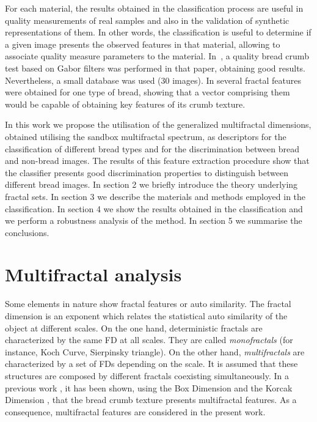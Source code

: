 \documentclass[oneside,a4paper,english,links]{article}
\begin{document}
For each material, the results obtained in the classification process are useful in quality measurements of real samples and also in the validation of synthetic representations of them. In other words, the classification is useful to determine if a given image presents the observed features in that material, allowing to associate quality measure parameters to the material. In~\cite{Fan2006}, a quality bread crumb test based on Gabor filters was performed in that paper, obtaining good results. Nevertheless, a small database was used ($30$ images). In \cite{Gonzales2008} several fractal features were obtained for one type of bread, showing that a vector comprising them would be capable of obtaining key features of its crumb texture.

In this work we propose the utilisation of the generalized multifractal dimensions, obtained utilising the sandbox multifractal spectrum, as descriptors for the classification of different bread types and for the discrimination between bread and non-bread images. The results of this feature extraction procedure show that the classifier presents good discrimination properties to distinguish between different bread images. In section 2 we briefly introduce the theory underlying fractal sets. In section 3 we describe the materials and methods employed in the classification. In section 4 we show the results obtained in the classification and we perform a robustness analysis of the method. In section 5 we summarise the conclusions.

\section{Multifractal analysis}
Some elements in nature show fractal features or auto similarity. The fractal dimension is an exponent which relates the statistical auto similarity of the object at different scales. On the one hand, deterministic fractals are characterized by the same FD at all scales. They are called {\em monofractals} (for instance, Koch Curve, Sierpinsky triangle). On the other hand, {\em multifractals} \cite{Mandelbrot89} are characterized by a set of FDs depending on the scale. It is assumed that these structures are composed by different fractals coexisting simultaneously. In a previous work \cite{Baravalle2012}, it has been shown, using the Box Dimension and the Korcak Dimension \cite{Imre11}, that the bread crumb texture presents multifractal features. As a consequence, multifractal features are considered in the present work.
\end{document}

